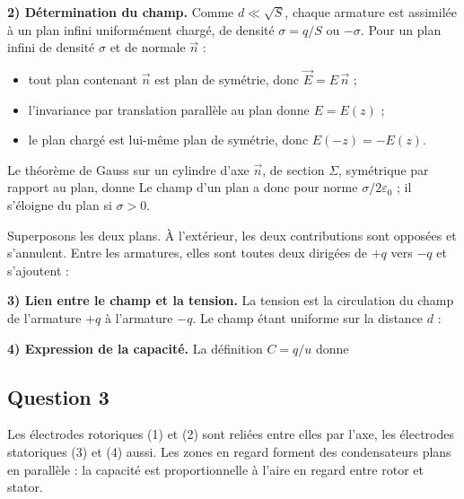 \documentclass[11pt,a4paper]{article}
\providecommand{\tightlist}{\setlength{\itemsep}{0pt}\setlength{\parskip}{0pt}}
\newcommand{\equationajustee}[1]{%
  \sbox{\boiteequation}{$\displaystyle #1$}%
  \ifdim\wd\boiteequation>\linewidth
    \[\resizebox{\linewidth}{!}{\usebox{\boiteequation}}\]%
  \else
    \[#1\]%
  \fi}
\begin{document}
\textbf{2) Détermination du champ.} Comme \(d\ll\sqrt S\), chaque armature est assimilée à un plan infini uniformément chargé, de densité \(\sigma=q/S\) ou \(-\sigma\). Pour un plan infini de densité \(\sigma\) et de normale \(\vec n\) :

\begin{itemize}
\tightlist
\item
  tout plan contenant \(\vec n\) est plan de symétrie, donc \(\vec E=E\,\vec n\) ;
\item
  l'invariance par translation parallèle au plan donne \(E=E(z)\) ;
\item
  le plan chargé est lui-même plan de symétrie, donc \(E(-z)=-E(z)\).
\end{itemize}

Le théorème de Gauss sur un cylindre d'axe \(\vec n\), de section \(\Sigma\), symétrique par rapport au plan, donne
\equationajustee{2E\Sigma=\frac{\sigma\Sigma}{\varepsilon_0}}
Le champ d'un plan a donc pour norme \(\sigma/2\varepsilon_0\) ; il s'éloigne du plan si \(\sigma>0\).

Superposons les deux plans. À l'extérieur, les deux contributions sont opposées et s'annulent. Entre les armatures, elles sont toutes deux dirigées de \(+q\) vers \(-q\) et s'ajoutent :
\equationajustee{\boxed{\vec E=\frac{q}{\varepsilon_0S}\,\vec u_{+\to-}}}

\textbf{3) Lien entre le champ et la tension.} La tension est la circulation du champ de l'armature \(+q\) à l'armature \(-q\). Le champ étant uniforme sur la distance \(d\) :
\equationajustee{\begin{aligned}
u&=V_+-V_-\\
&=\int_+^-\vec E\cdot\mathrm d\vec\ell\\
&=Ed\\
&=\frac{qd}{\varepsilon_0S}
\end{aligned}}

\textbf{4) Expression de la capacité.} La définition \(C=q/u\) donne
\equationajustee{\boxed{C=\frac{\varepsilon_0S}{d}}}

\hypertarget{question-3}{%
\subsection{Question 3}\label{question-3}}

Les électrodes rotoriques (1) et (2) sont reliées entre elles par l'axe, les électrodes statoriques (3) et (4) aussi. Les zones en regard forment des condensateurs plans en parallèle : la capacité est proportionnelle à l'aire en regard entre rotor et stator.
\end{document}

